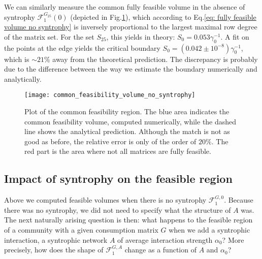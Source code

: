 \documentclass[12pt, titlepage]{report}
\begin{document}
We can similarly measure the common fully feasible volume in the absence of syntrophy $\mathcal{F}_1^{G_{25}}(0)$ (depicted in Fig.\ref{fig: common feasible volume no syntrophy}), which according to Eq.\eqref{eq: fully feasible volume no syntrophy} is inversely proportional to the largest maximal row degree of the matrix set. For the set $S_{25}$, this yields in theory: $S_0 = 0.053 \gamma_0^{-1}$. A fit on the points at the edge yields the critical boundary $S_0 = (0.042 \pm 10^{-8})\gamma_0^{-1}$, which is $\sim 21 \%$ away from the theoretical prediction. The discrepancy is probably due to the difference between the way we estimate the boundary numerically and analytically.
\begin{figure}[h!]
\centering
\texttt{[image: common\_feasibility\_volume\_no\_syntrophy]}
\caption{Plot of the common feasibility region. The blue area indicates the common feasibility volume, computed numerically, while the dashed line shows the analytical prediction. Although the match is not as good as before, the relative error is only of the order of $20 \%$. The red part is the area where not all matrices are fully feasible.}
\label{fig: common feasible volume no syntrophy}
\end{figure}

\FloatBarrier
\clearpage
\subsection{Impact of syntrophy on the feasible region}\label{sec: impact of syntrophy on feasible region}

Above we computed feasible volumes when there is no syntrophy \ie $\mathcal{F}^{G,0}_1$. Because there was no syntrophy, we did not need to specify what the structure of $A$ was. The next naturally arising question is then: what happens to the feasible region of a community with a given consumption matrix $G$ when we add a syntrophic interaction, \ie a syntrophic network $A$ of average interaction strength $\alpha_0$? More precisely, how does the shape of $\mathcal{F}^{G,A}_1$ change as a function of $A$ and $\alpha_0$?
\end{document}
